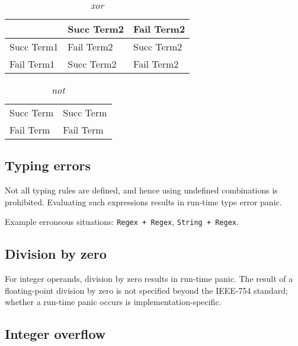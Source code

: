 \begin{bnfutils}
  \begin{table}[ht]
    \caption{\emph{xor}}
    \begin{center}
    \begin{tabular}[t]{l|l|l}
        & Succ Term2 & Fail Term2 \\
      \hline
      Succ Term1 & Fail Term2 & Succ Term2 \\
      Fail Term1 & Succ Term2 & Fail Term2 
    \end{tabular}
    \end{center}
  \end{table}
\end{bnfutils}

\begin{bnfutils}
  \begin{table}[!htbp]
    \caption{\emph{not}}
    \begin{center}
    \begin{tabular}[t]{l|l}
      Succ Term & Succ Term \\
      Fail Term & Fail Term 
    \end{tabular}
    \end{center}
  \end{table}
\end{bnfutils}

\subsection{Typing errors}

Not all typing rules are defined, and hence using undefined combinations is prohibited. Evaluating such expressions results in run-time type error panic.

Example erroneous situations: \lstinline{Regex + Regex}, \lstinline{String + Regex}.

\subsection{Division by zero}

For integer operands, division by zero results in run-time panic. The result of a floating-point division by zero is not specified beyond the IEEE-754\cite{IEEE754} standard; whether a run-time panic occurs is implementation-specific.

\subsection{Integer overflow}

